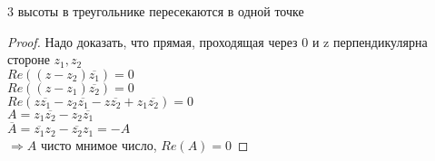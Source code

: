 \begin{theorem}
	3 высоты в треугольнике пересекаются в одной точке \\
	\begin{proof}
		Надо доказать, что прямая, проходящая через 0 и z перпендикулярна стороне $ z_1, z_2 $ \\
		$ Re((z - z_2) \overline{z_1} ) = 0 $ \\
		$ Re((z - z_1) \overline{z_2} ) = 0 $ \\
		$ Re(z \overline{z_1} - z_2 \overline{z_1} - z \overline{z_2} + z_1\overline{z_2}) = 0 $ \\
		
		$ A = z_1 \overline{z_2} - z_2 \overline{z_1} $ \\
		$ \overline{A} = \overline{z_1} z_2 - \overline{z_2} z_1 = -A $ \\
		$ \Rightarrow A $ чисто мнимое число, $ Re(A) = 0 $  
	\end{proof}
\end{theorem}






